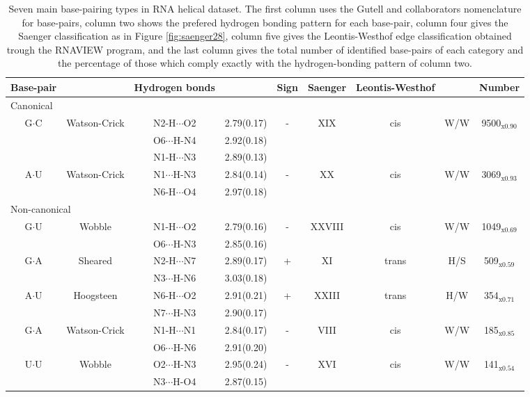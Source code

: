 \begin{table}
\begin{center}
\begin{tabular}{|c c|c c|c|c|c c|c|}
\hline
Base-pair & & Hydrogen bonds &  & Sign & Saenger & Leontis-Westhof & &
Number \\
\hline
\hline
\multicolumn{9}{|l|}{Canonical} \\
\hline
G$\cdot$C & Watson-Crick & N2-H$\cdots$O2 & 2.79(0.17) & - & XIX & cis
 & W/W & 9500$_{\text{x0.90}}$ \\
 & & O6$\cdots$H-N4 & 2.92(0.18) & & & & &  \\
 & & N1-H$\cdots$N3 & 2.89(0.13) & & & & &  \\
\hline
A$\cdot$U & Watson-Crick & N1$\cdots$H-N3 & 2.84(0.14) & - & XX & cis
& W/W & 3069$_{\text{x0.93}}$ \\
 & & N6-H$\cdots$O4 & 2.97(0.18) & & & & &  \\
\hline
\multicolumn{9}{|l|}{Non-canonical} \\
\hline
G$\cdot$U & Wobble & N1-H$\cdots$O2 & 2.79(0.16) & - & XXVIII & cis
 & W/W & 1049$_{\text{x0.69}}$ \\
 & & O6$\cdots$H-N3 & 2.85(0.16) & & & & &  \\
\hline
G$\cdot$A & Sheared & N2-H$\cdots$N7 & 2.89(0.17) & + & XI & trans
 & H/S & 509$_{\text{x0.59}}$ \\
 & & N3$\cdots$H-N6 & 3.03(0.18) & & & & &  \\
\hline
A$\cdot$U & Hoogsteen & N6-H$\cdots$O2 & 2.91(0.21) & + & XXIII & trans
 & H/W & 354$_{\text{x0.71}}$ \\
 & & N7$\cdots$H-N3 & 2.90(0.17) & & & & &  \\
\hline
G$\cdot$A & Watson-Crick & N1-H$\cdots$N1 & 2.84(0.17) & - & VIII & cis
 & W/W & 185$_{\text{x0.85}}$ \\
 & & O6$\cdots$H-N6 & 2.91(0.20) & & & & &  \\
\hline
U$\cdot$U & Wobble & O2$\cdots$H-N3 & 2.95(0.24) & - & XVI & cis
 & W/W & 141$_{\text{x0.54}}$ \\
 & & N3$\cdots$H-O4 & 2.87(0.15) & & & & &  \\
\hline
\end{tabular}
\caption{Seven  main base-pairing  types in  RNA helical  dataset. The
  first  column uses  the  Gutell and  collaborators nomenclature  for
  base-pairs, column  two shows the prefered  hydrogen bonding pattern
  for each base-pair, column  four gives the Saenger classification as
  in Figure \ref{fig:saenger28}, column five gives the Leontis-Westhof
  edge  classification obtained  trough the  RNAVIEW program,  and the
  last column gives the total  number of identified base-pairs of each
  category and the  percentage of those which comply  exactly with the
  hydrogen-bonding pattern of column two.}
\label{tab:seven}
\end{center}  
\end{table}  

